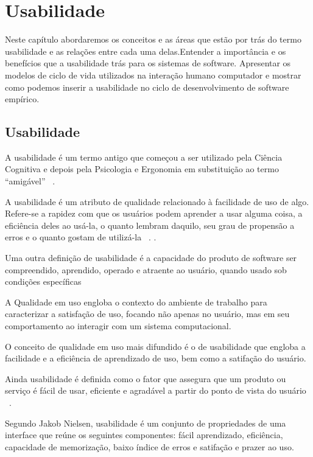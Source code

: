 \chapter{Usabilidade}

	Neste capítulo abordaremos os conceitos e as áreas que estão por trás do termo usabilidade e as relações entre cada uma delas.Entender a importância e os benefícios que a usabilidade trás para os sistemas de software. Apresentar os modelos de ciclo de vida utilizados na interação humano computador e mostrar como podemos inserir a usabilidade no ciclo de desenvolvimento de software empírico.

\section {Usabilidade}

	A usabilidade é um termo antigo que começou a ser utilizado pela Ciência Cognitiva e depois pela Psicologia e Ergonomia em substituição ao termo “amigável” ~\cite{dias2006}.

	A usabilidade é um atributo de qualidade relacionado à facilidade de uso de algo. Refere-se a rapidez com que os usuários podem aprender a usar alguma coisa, a eficiência deles ao usá-la, o quanto lembram daquilo, seu grau de propensão a erros e o quanto gostam de utilizá-la ~\cite{nielsen2007}. .

	Uma outra definição de usabilidade é a capacidade do produto de software ser compreendido, aprendido, operado e atraente ao usuário, quando usado sob condições específicas ~\cite{iso9126-1}

	A Qualidade em uso engloba o contexto do ambiente de trabalho para caracterizar a satisfação de uso, focando não apenas no usuário, mas em seu comportamento ao interagir com um sistema computacional.

	O conceito de qualidade em uso mais difundido é o de usabilidade que engloba a facilidade e a eficiência de aprendizado de uso, bem como a satifação do usuário. 	
	
	Ainda usabilidade é definida como o fator que assegura que um produto ou serviço é fácil de usar, eficiente e agradável a partir do ponto de vista do usuário ~\cite{preece2007}.

	Segundo Jakob Nielsen, usabilidade é um conjunto de propriedades de uma interface que reúne os seguintes componentes: fácil aprendizado, eficiência, capacidade de memorização, baixo índice de erros e satifação e prazer ao uso.


